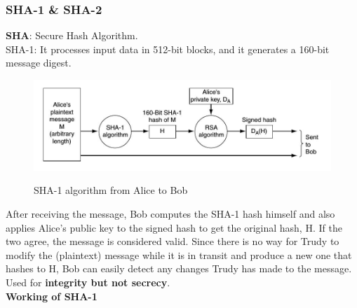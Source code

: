 \documentclass[a4paper,oneside]{book}
\begin{document}
\subsubsection{SHA-1 \& SHA-2}
\textbf{SHA}: Secure Hash Algorithm.\\
SHA-1: It processes input data in 512-bit blocks, and it generates a 160-bit message digest. 
\begin{figure}[H]
\caption{SHA-1 algorithm from Alice to Bob}
\includegraphics[scale=0.7]{Images/sha1}
\label{fig:sha1}
\end{figure}
After receiving the message, Bob computes the SHA-1 hash himself and also applies Alice’s public key to the signed hash to get the original hash, H. If the two agree, the message is considered valid. Since there is no way for Trudy to modify the (plaintext) message while it is in transit and produce a new one that hashes to H, Bob can easily detect any changes Trudy has made to the message. Used for \textbf{integrity but not secrecy}.\\
\textbf{Working of SHA-1}
\end{document}
